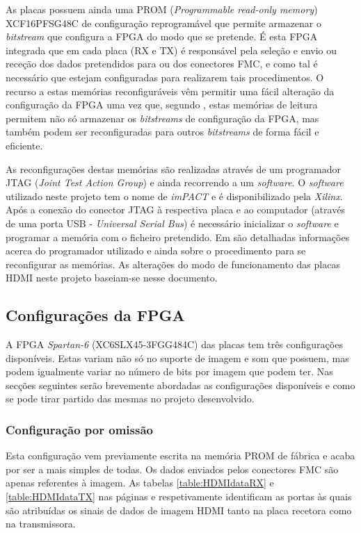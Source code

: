 As placas possuem ainda uma PROM (\textit{Programmable read-only memory}) XCF16PFSG48C de configuração reprogramável que permite armazenar o \textit{bitstream} que configura a FPGA do modo que se pretende. É esta FPGA integrada que em cada placa (RX e TX) é responsável pela seleção e envio ou receção dos dados pretendidos para ou dos conectores FMC, e como tal é necessário que estejam configuradas para realizarem tais procedimentos. O recurso a estas memórias reconfiguráveis vêm permitir uma fácil alteração da configuração da FPGA uma vez que, segundo \cite{R026}, estas memórias de leitura permitem não só armazenar os \textit{bitstreams} de configuração da FPGA, mas também podem ser reconfiguradas para outros \textit{bitstreams} de forma fácil e eficiente.

As reconfigurações destas memórias são realizadas através de um programador JTAG (\textit{Joint Test Action Group}) e ainda recorrendo a um \textit{software}. O \textit{software} utilizado neste projeto tem o nome de \textit{imPACT} e é disponibilizado pela \textit{Xilinx}. Após a conexão do conector JTAG à respectiva placa e ao computador (através de uma porta USB - \textit{Universal Serial Bus}) é necessário inicializar o \textit{software} e programar a memória com o ficheiro pretendido. Em \cite{R025} são detalhadas informações acerca do programador utilizado e ainda sobre o procedimento para se reconfigurar as memórias. As alterações do modo de funcionamento das placas HDMI neste projeto baseiam-se nesse documento.

\subsection{Configurações da FPGA} \label{subsec:HDMIconfig}

A FPGA \textit{Spartan-6} (XC6SLX45-3FGG484C) das placas tem três configurações disponíveis. Estas variam não só no suporte de imagem e som que possuem, mas podem igualmente variar no número de bits por imagem que podem ter. Nas secções seguintes serão brevemente abordadas as configurações disponíveis e como se pode tirar partido das mesmas no projeto desenvolvido.

\subsubsection{Configuração por omissão} \label{subsubsec:HDMIconfigdefault}

Esta configuração vem previamente escrita na memória PROM de fábrica e acaba por ser a mais simples de todas. Os dados enviados pelos conectores FMC são apenas referentes à imagem. As tabelas \ref{table:HDMIdataRX} e \ref{table:HDMIdataTX} nas páginas \pageref{table:HDMIdataRX} e \pageref{table:HDMIdataTX} respetivamente identificam as portas às quais são atribuídas os sinais de dados de imagem HDMI tanto na placa recetora como na transmissora.

